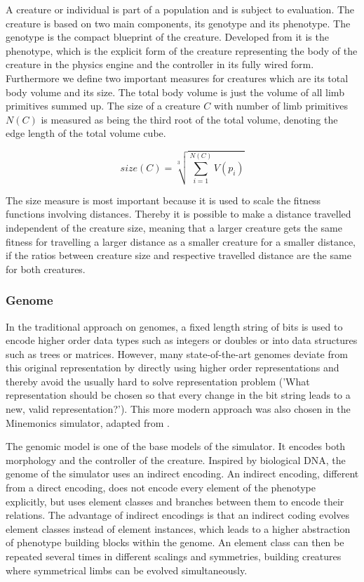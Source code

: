 \documentclass[main]{subfiles}
\begin{document}
A creature or individual is part of a population and is subject to evaluation. %
%
The creature is based on two main components, its genotype and its phenotype. %
%
The genotype is the compact blueprint of the creature. %
%
Developed from it is the phenotype, which is the explicit form of the creature representing the body of the creature in the physics engine and the controller in its fully wired form. %
%
Furthermore we define two important measures for creatures which are its total body volume and its size. %
%
The total body volume is just the volume of all limb primitives summed up. %
%
The size of a creature \(C\) with number of limb primitives \(N(C)\) is measured as being the third root of the total volume, denoting the edge length of the total volume cube. 

\[size(C) = \sqrt[3]{\sum\limits^{N(C)}_{i=1} V(p_i)}\]

The size measure is most important because it is used to scale the fitness functions involving distances. %
%
Thereby it is possible to make a distance travelled independent of the creature size, meaning that a larger creature gets the same fitness for travelling a larger distance as a smaller creature for a smaller distance, if the ratios between creature size and respective travelled distance are the same for both creatures.

\subsubsection{Genome}

In the traditional approach on genomes, a fixed length string of bits is used to encode higher order data types such as integers or doubles or into data structures such as trees or matrices. %
%
However, many state-of-the-art genomes deviate from this original representation by directly using higher order representations and thereby avoid the usually hard to solve representation problem ('What representation should be chosen so that every change in the bit string leads to a new, valid representation?'). %
%
This more modern approach was also chosen in the Minemonics simulator, adapted from \cite{bib:Graham2009}.

The genomic model is one of the base models of the simulator. %
%
It encodes both morphology and the controller of the creature. %
%
Inspired by biological DNA, the genome of the simulator uses an indirect encoding. %
%
An indirect encoding, different from a direct encoding, does not encode every element of the phenotype explicitly, but uses element classes and branches between them to encode their relations. %
%
The advantage of indirect encodings is that an indirect coding evolves element classes instead of element instances, which leads to a higher abstraction of phenotype building blocks within the genome. %
%
An element class can then be repeated several times in different scalings and symmetries, building creatures where symmetrical limbs can be evolved simultaneously.
\end{document}
